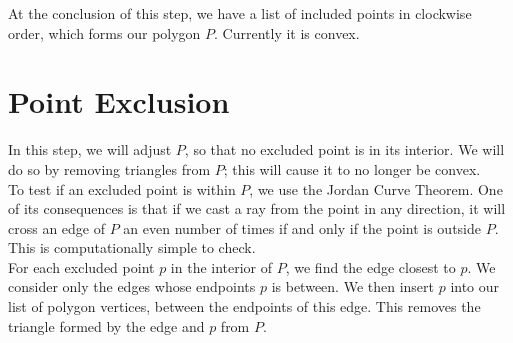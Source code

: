 \documentclass[paper=a4, fontsize=11pt]{scrartcl} %
\numberwithin{equation}{section} %
\numberwithin{figure}{section} %
\numberwithin{table}{section} %
\begin{document}
At the conclusion of this step, we have a list of included points in clockwise
order, which forms our polygon $P$. Currently it is convex.

\section{Point Exclusion}
In this step, we will adjust $P$, so that no excluded point is in its interior.
We will do so by removing triangles from $P$; this will cause it to no longer be
convex. \\

To test if an excluded point is within $P$, we use the Jordan Curve Theorem. One
of its consequences is that if we cast a ray from the point in any direction,
it will cross an edge of $P$ an even number of times if and only if the point is
outside $P$.  This is computationally simple to check. \\

For each excluded point $p$ in the interior of $P$, we find the edge closest to
$p$. We consider only the edges whose endpoints $p$ is between.  We then insert
$p$ into our list of polygon vertices, between the endpoints of this edge. This
removes the triangle formed by the edge and $p$ from $P$. \\
\end{document}
